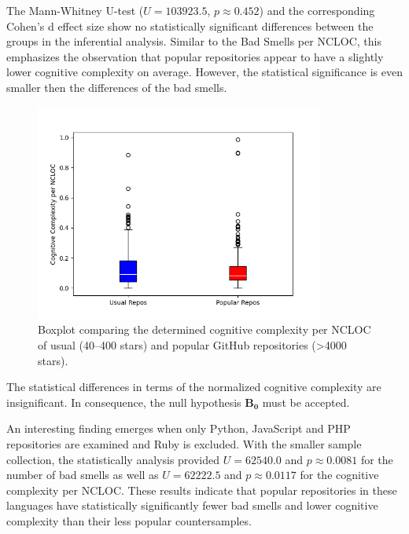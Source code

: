 \documentclass[a4paper, 12pt]{article}
\begin{document}
The Mann-Whitney U-test ($U = 103923.5$, $p \approx 0.452$) and the corresponding Cohen's d effect size show no statistically significant differences between the groups in the inferential analysis. Similar to the Bad Smells per NCLOC, this emphasizes the observation that popular repositories appear to have a slightly lower cognitive complexity on average. However, the statistical significance is even smaller then the differences of the bad smells.

\begin{figure}[h]
  \centering
  \includegraphics[width=0.85\textwidth]{../media/cmplx-boxplot.png}
  \caption{Boxplot comparing the determined cognitive complexity per NCLOC of usual (40--400 stars) and popular GitHub repositories (>4000 stars).}
  \label{fig:box-cmplx}
\end{figure}

\vspace{0.5em}
\begin{leftbar}
The statistical differences in terms of the normalized cognitive complexity are insignificant. In consequence, the null hypothesis $\mathbf{B_0}$ must be accepted. 
\end{leftbar}
\vspace{0.5em}

An interesting finding emerges when only Python, JavaScript and PHP repositories are examined and Ruby is excluded. With the smaller sample collection, the statistically analysis provided $U = 62540.0$ and $p \approx 0.0081$ for the number of bad smells as well as $U = 62222.5$ and $p \approx 0.0117$ for the cognitive complexity per NCLOC. These results indicate that popular repositories in these languages have statistically significantly fewer bad smells and lower cognitive complexity than their less popular countersamples.\\
\end{document}
